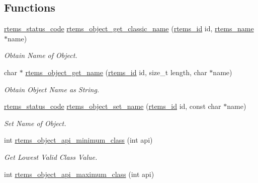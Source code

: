 \subsection*{Functions}
\begin{DoxyCompactItemize}
\item 
\mbox{\hyperlink{group__ClassicStatus_ga545d41846817eaba6143d52ee4d9e9fe}{rtems\+\_\+status\+\_\+code}} \mbox{\hyperlink{group__ClassicClassInfo_gafdc1e4c47358d656223c5611eab9a3ec}{rtems\+\_\+object\+\_\+get\+\_\+classic\+\_\+name}} (\mbox{\hyperlink{group__ClassicTasks_gab20892b814dced7dd4e5b9bf42becd57}{rtems\+\_\+id}} id, \mbox{\hyperlink{group__ClassicTasks_ga55fb63c49f68c0cbd9bee004da15b1fd}{rtems\+\_\+name}} $\ast$name)
\begin{DoxyCompactList}\small\item\em Obtain Name of Object. \end{DoxyCompactList}\item 
char $\ast$ \mbox{\hyperlink{group__ClassicClassInfo_ga85242d8af75f936826239cf37493fe0b}{rtems\+\_\+object\+\_\+get\+\_\+name}} (\mbox{\hyperlink{group__ClassicTasks_gab20892b814dced7dd4e5b9bf42becd57}{rtems\+\_\+id}} id, size\+\_\+t length, char $\ast$name)
\begin{DoxyCompactList}\small\item\em Obtain Object Name as String. \end{DoxyCompactList}\item 
\mbox{\hyperlink{group__ClassicStatus_ga545d41846817eaba6143d52ee4d9e9fe}{rtems\+\_\+status\+\_\+code}} \mbox{\hyperlink{group__ClassicClassInfo_gacb1a1933caf2556aa7e9b715c684fe5b}{rtems\+\_\+object\+\_\+set\+\_\+name}} (\mbox{\hyperlink{group__ClassicTasks_gab20892b814dced7dd4e5b9bf42becd57}{rtems\+\_\+id}} id, const char $\ast$name)
\begin{DoxyCompactList}\small\item\em Set Name of Object. \end{DoxyCompactList}\item 
int \mbox{\hyperlink{group__ClassicClassInfo_ga30005a0608899d37e7879f9867c0393f}{rtems\+\_\+object\+\_\+api\+\_\+minimum\+\_\+class}} (int api)
\begin{DoxyCompactList}\small\item\em Get Lowest Valid Class Value. \end{DoxyCompactList}\item 
int \mbox{\hyperlink{group__ClassicClassInfo_ga83bbd111ed4c350325e0c3519b0c54a6}{rtems\+\_\+object\+\_\+api\+\_\+maximum\+\_\+class}} (int api)

\end{DoxyCompactItemize}
